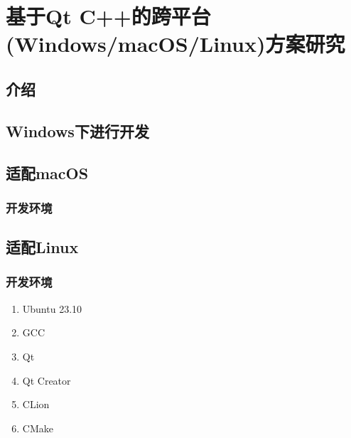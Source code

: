 \chapter{基于Qt C++的跨平台(Windows/macOS/Linux)方案研究}
\label{chapter:10}

\section{介绍}

\section{Windows下进行开发}

\section{适配macOS}

\subsection{开发环境}

\section{适配Linux}

\subsection{开发环境}

\begin{enumerate}
	\item Ubuntu 23.10
	\item GCC
	\item Qt
	\item Qt Creator
	\item CLion
	\item CMake
\end{enumerate}
